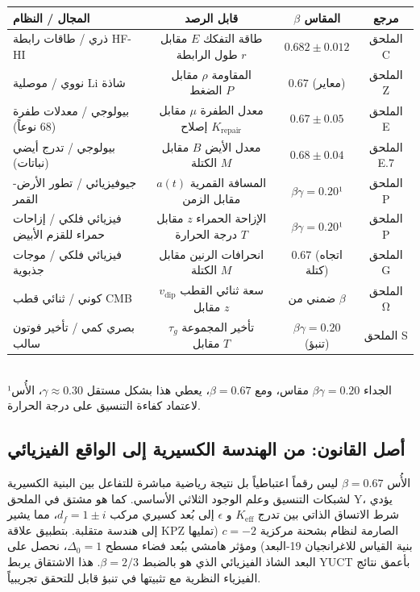 \documentclass[11pt,a4paper]{article}
\begin{document}
	\begin{table}[htbp]
		\centering
		\small
		\begin{english}
			\begin{tabular}{@{}lccc@{}}
				\toprule
				\textbf{المجال / النظام} & \textbf{قابل الرصد} & \textbf{$\beta$ المقاس} & \textbf{مرجع} \\
				\midrule
				ذري / طاقات رابطة HF-HI & طاقة التفكك $E$ مقابل طول الرابطة $r$ & $0.682 \pm 0.012$ & الملحق C \\
				نووي / موصلية Li شاذة & المقاومة $\rho$ مقابل الضغط $P$ & $0.67$ (معاير) & الملحق Z \\
				بيولوجي / معدلات طفرة (68 نوعاً) & معدل الطفرة $\mu$ مقابل إصلاح $K_{\mathrm{repair}}$ & $0.67 \pm 0.05$ & الملحق E \\
				بيولوجي / تدرج أيضي (نباتات) & معدل الأيض $B$ مقابل الكتلة $M$ & $0.68 \pm 0.04$ & الملحق E.7 \\
				جيوفيزيائي / تطور الأرض-القمر & المسافة القمرية $a(t)$ مقابل الزمن & $\beta\gamma = 0.20$¹ & الملحق P \\
				فيزيائي فلكي / إزاحات حمراء للقزم الأبيض & الإزاحة الحمراء $z$ مقابل درجة الحرارة $T$ & $\beta\gamma = 0.20$¹ & الملحق P \\
				فيزيائي فلكي / موجات جذبوية & انحرافات الرنين مقابل الكتلة $M$ & $0.67$ (اتجاه كتلة) & الملحق G \\
				كوني / ثنائي قطب CMB & سعة ثنائي القطب $v_{\mathrm{dip}}$ مقابل $z$ & ضمني من $\beta$ & الملحق Ω \\
				بصري كمي / تأخير فوتون سالب & تأخير المجموعة $\tau_g$ مقابل $T$ & $\beta\gamma = 0.20$ (تنبؤ) & الملحق S \\
				\bottomrule
			\end{tabular}
		\end{english}
		\\[4pt]
		\footnotesize{¹الجداء $\beta\gamma = 0.20$ مقاس، ومع $\beta = 0.67$، يعطي هذا بشكل مستقل $\gamma \approx 0.30$، الأُس لاعتماد كفاءة التنسيق على درجة الحرارة.}
	\end{table}
	
	\subsection{أصل القانون: من الهندسة الكسيرية إلى الواقع الفيزيائي}
	
	الأُس $\beta = 0.67$ ليس رقماً اعتباطياً بل نتيجة رياضية مباشرة للتفاعل بين البنية الكسيرية لشبكات التنسيق وعلم الوجود الثلاثي الأساسي. كما هو مشتق في الملحق Y، يؤدي شرط الاتساق الذاتي بين تدرج $K_{\mathrm{eff}}$ و $\epsilon$ إلى بُعد كسيري مركب $d_f = 1 \pm i$، مما يشير إلى هندسة متقلبة. بتطبيق علاقة KPZ الصارمة لنظام بشحنة مركزية $c = -2$ (تمليها بنية القياس للاغرانجيان 19-البعد) ومؤثر هامشي ببُعد فضاء مسطح $\Delta_0 = 1$، نحصل على البعد الشاذ الفيزيائي الذي هو بالضبط $\beta = 2/3$. هذا الاشتقاق يربط YUCT بأعمق نتائج الفيزياء النظرية مع تثبيتها في تنبؤ قابل للتحقق تجريبياً.
	
\end{document}
